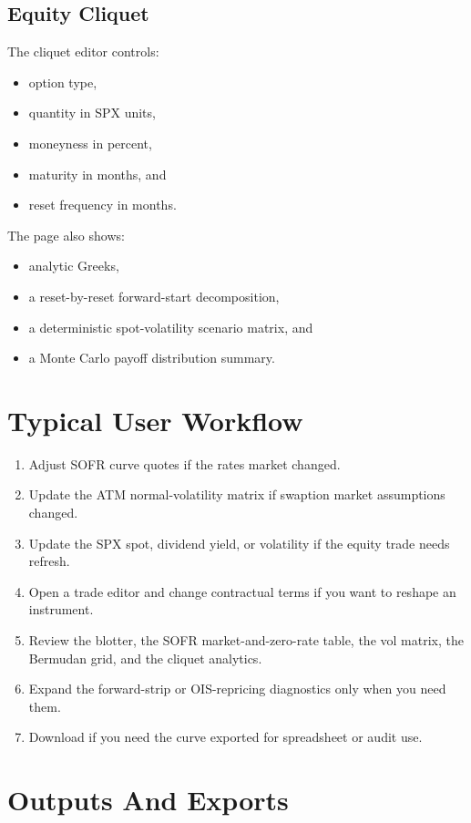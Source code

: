 \documentclass[11pt]{article}
\begin{document}
\subsection{Equity Cliquet}
The cliquet editor controls:
\begin{itemize}[leftmargin=1.5em]
    \item option type,
    \item quantity in SPX units,
    \item moneyness in percent,
    \item maturity in months, and
    \item reset frequency in months.
\end{itemize}
The page also shows:
\begin{itemize}[leftmargin=1.5em]
    \item analytic Greeks,
    \item a reset-by-reset forward-start decomposition,
    \item a deterministic spot-volatility scenario matrix, and
    \item a Monte Carlo payoff distribution summary.
\end{itemize}

\section{Typical User Workflow}
\begin{enumerate}[leftmargin=1.5em]
    \item Adjust SOFR curve quotes if the rates market changed.
    \item Update the ATM normal-volatility matrix if swaption market assumptions changed.
    \item Update the SPX spot, dividend yield, or volatility if the equity trade needs refresh.
    \item Open a trade editor and change contractual terms if you want to reshape an instrument.
    \item Review the blotter, the SOFR market-and-zero-rate table, the vol matrix, the Bermudan grid, and the cliquet analytics.
    \item Expand the forward-strip or OIS-repricing diagnostics only when you need them.
    \item Download  if you need the curve exported for spreadsheet or audit use.
\end{enumerate}

\section{Outputs And Exports}
\end{document}
